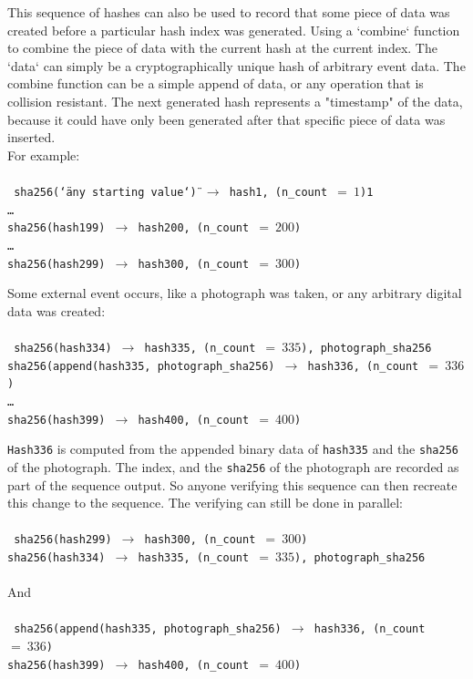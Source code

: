 \documentclass[12pt]{article}
\begin{document}
This sequence of hashes can also be used to record that some piece of data was created before a particular hash index was generated. Using a `combine` function to combine the piece of data with the current hash at the current index. The `data` can simply be a cryptographically unique hash of arbitrary event data. The combine function can be a simple append of data, or any operation that is collision resistant. The next generated hash represents a "timestamp" of the data, because it could have only been generated after that specific piece of data was inserted.\\

\noindent For example:\\\\\noindent
\texttt{
sha256(\char`\"any starting value\char`\") $\rightarrow$ hash1,
(n\_count $=~1$)1\\
\ldots\\
sha256(hash199) $\rightarrow$ hash200, (n\_count $=~200$)\\
\ldots\\
sha256(hash299) $\rightarrow$ hash300, (n\_count $=~300$)\\
}

\noindent Some external event occurs, like a photograph was taken, or
any arbitrary digital data was created:\\\\\noindent
\texttt{
  sha256(hash334) $\rightarrow$ hash335, (n\_count $=~335$), photograph\_sha256\\
  sha256(append(hash335, photograph\_sha256) $\rightarrow$ hash336,
  (n\_count $=~336$)\\
  \ldots\\
  sha256(hash399) $\rightarrow$ hash400, (n\_count $=~400$)\\
}

\texttt{Hash336} is computed from the appended binary data of
\texttt{hash335} and the \texttt{sha256} of the photograph. The index,
and the \texttt{sha256} of the photograph are recorded as part of the
sequence output. So anyone verifying this sequence can then recreate
this change to the sequence. The verifying can still be done in
parallel:\\\\\noindent
\texttt{
  sha256(hash299) $\rightarrow$ hash300, (n\_count $=~300$)\\
  sha256(hash334) $\rightarrow$ hash335, (n\_count $=~335$), photograph\_sha256\\
}\\\noindent
And\\\\\noindent
\texttt{
  sha256(append(hash335, photograph\_sha256) $\rightarrow$ hash336,
  (n\_count $=~336$)\\
  sha256(hash399) $\rightarrow$ hash400, (n\_count $=~400$)\\
}
\end{document}
